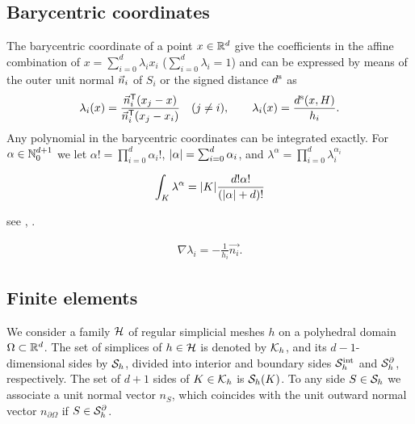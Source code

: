 \subsection{Barycentric coordinates}\label{subsec:}
%
The barycentric coordinate of a point $x\in\R^d$ give the coefficients in the affine combination of 
$x=\sum_{i=0}^d \lambda_i x_i$ ($\sum_{i=0}^d\lambda_i=1$) and can be expressed by means of the outer unit normal $\normal[i]$ of $S_i$ or the signed distance $d^{\rm s}$ as 
%
\begin{equation}\label{eq:BarycentricHyperplanePoint}
\lambda_i(x) = \frac{\transpose{\normal[i]}(x_j-x)}{\transpose{\normal[i]}(x_j-x_i)}\quad (j\ne i),\qquad \lambda_i(x) = \frac{d^{\rm s}(x,H)}{h_i}.
\end{equation}
%
%
Any polynomial in the barycentric coordinates can be integrated exactly. For $\alpha\in\N_0^{d+1}$ we 
let $\alpha! = \prod_{i=0}^d \alpha_i!$, $\abs{\alpha}=\sum_{i=0}^d\alpha_i$, and $\lambda^{\alpha} = \prod_{i=0}^d \lambda_i^{\alpha_i}$
%
\begin{yellowbox}[Integration on $K$]
\begin{equation}\label{eq:IntegrationFormulaBary}
\int_K \lambda^{\alpha} =|K|\frac{ d!\alpha!}{\left( \abs{\alpha} + d\right)!}
\end{equation}
\end{yellowbox}
%
see \cite{EisenbergMalvern73}, \cite{VermolenSegal18}.
%
%
\begin{yellowbox}
\begin{align*}
\nabla \lambda_i = - \frac{1}{h_i}\vec{n_i}. 
\end{align*}
\end{yellowbox}
%
%
\subsection{Finite elements}\label{subsec:}
%
%
We consider a family $\allmeshes$ of regular simplicial meshes $h$ on a polyhedral domain $\Omega\subset \R^d$. 
The set of simplices of $h\in\allmeshes$ is denoted by $\Cells_h$, and its $d-1$-dimensional sides by $\Sides_h$, divided into interior and boundary sides $\SidesInt_h$ and $\SidesBdry_h$, respectively. 
The set of $d+1$ sides of $K\in\Cells_h$ is $\Sides_h(K)$. To any side $S\in\Sides_h$ we associate a unit normal vector $n_S$, which coincides with the unit outward normal vector $n_{\partial\Omega}$ if $S\in\SidesBdry_h$.

